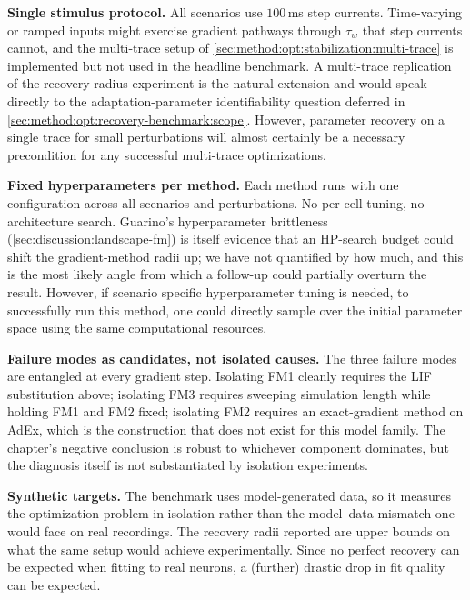 \textbf{Single stimulus protocol.}
All scenarios use $100$\,ms step currents.
Time-varying or ramped inputs might exercise gradient pathways through $\tau_w$ that step currents cannot, and the multi-trace setup of \cref{sec:method:opt:stabilization:multi-trace} is implemented but not used in the headline benchmark.
A multi-trace replication of the recovery-radius experiment is the natural extension and would speak directly to the adaptation-parameter identifiability question deferred in \cref{sec:method:opt:recovery-benchmark:scope}.
However, parameter recovery on a single trace for small perturbations will almost certainly be a necessary precondition for any successful multi-trace optimizations.

\textbf{Fixed hyperparameters per method.}
Each method runs with one configuration across all scenarios and perturbations.
No per-cell tuning, no architecture search.
Guarino's hyperparameter brittleness (\cref{sec:discussion:landscape-fm}) is itself evidence that an \gls{HP}-search budget could shift the gradient-method radii up;
we have not quantified by how much, and this is the most likely angle from which a follow-up could partially overturn the result.
However, if scenario specific hyperparameter tuning is needed, to successfully run this method, one could directly sample over the initial parameter space using the same computational resources.

\textbf{Failure modes as candidates, not isolated causes.}
The three failure modes are entangled at every gradient step.
Isolating FM1 cleanly requires the LIF substitution above;
isolating FM3 requires sweeping simulation length while holding FM1 and FM2 fixed;
isolating FM2 requires an exact-gradient method on \gls{AdEx}, which is the construction that does not exist for this model family.
The chapter's negative conclusion is robust to whichever component dominates, but the diagnosis itself is not substantiated by isolation experiments.

\textbf{Synthetic targets.}
The benchmark uses model-generated data, so it measures the optimization problem in isolation rather than the model--data mismatch one would face on real recordings.
The recovery radii reported are upper bounds on what the same setup would achieve experimentally.
Since no perfect recovery can be expected when fitting to real neurons, a (further) drastic drop in fit quality can be expected.
